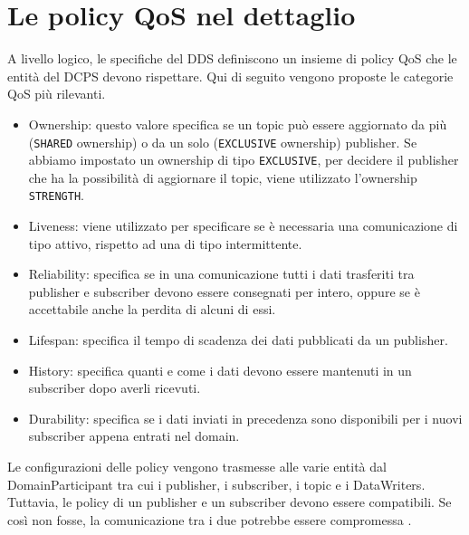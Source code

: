 \section{Le policy QoS nel dettaglio}
A livello logico, le specifiche del DDS
definiscono un insieme di policy QoS
che le entità del DCPS devono rispettare. Qui di seguito vengono
proposte le categorie QoS più rilevanti.
\begin{itemize}
    \item Ownership: questo valore specifica se un topic
    può essere aggiornato da più 
    (\texttt{SHARED} ownership) o da un solo (\texttt{EXCLUSIVE} ownership) publisher.
    Se abbiamo impostato un ownership di tipo \texttt{EXCLUSIVE}, per decidere il 
    publisher che ha la possibilità di aggiornare il topic, viene 
    utilizzato l'ownership \texttt{STRENGTH}.
    \item Liveness: viene utilizzato per specificare se è necessaria
    una comunicazione di tipo attivo, rispetto ad una di tipo 
    intermittente.
    \item Reliability: specifica se in una comunicazione tutti i dati
    trasferiti tra publisher e subscriber devono essere consegnati
    per intero, oppure
    se è accettabile anche la perdita di alcuni di essi.
    \item Lifespan: specifica il tempo di scadenza dei dati pubblicati da 
    un publisher.
    \item History: specifica quanti e come i dati devono essere 
    mantenuti in un 
    subscriber dopo averli ricevuti.
    \item Durability: specifica se i dati inviati in precedenza sono
    disponibili per i nuovi subscriber appena entrati nel domain.
\end{itemize}
Le configurazioni 
delle policy vengono trasmesse alle varie entità dal DomainParticipant
tra cui i publisher, i subscriber, i topic e i DataWriters.
Tuttavia, le policy di un publisher e un subscriber devono essere compatibili.
Se così non fosse, la comunicazione tra i due potrebbe essere compromessa
\cite{Michaud2017Apr}.
\label{Le policy QoS nel dettaglio}



